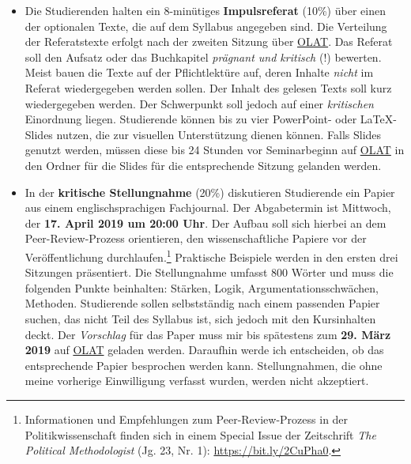 \documentclass[abstract=on,parskip=full,headings=standardclasses,fontsize=11pt,paper=a4]{scrartcl}
\begin{document}
\begin{itemize}
\item Die Studierenden halten ein 8-minütiges \textbf{Impulsreferat} (10\%)  über einen der optionalen Texte, die auf dem Syllabus angegeben sind. Die Verteilung der Referatstexte erfolgt nach der zweiten Sitzung über \href{https://lms.uzh.ch/url/RepositoryEntry/16539681116?guest=true&lang=en}{OLAT}. Das Referat soll den Aufsatz oder das Buchkapitel \textit{prägnant und kritisch} (!) bewerten. Meist bauen die Texte auf der Pflichtlektüre auf, deren Inhalte \textit{nicht} im Referat wiedergegeben werden sollen. Der Inhalt des gelesen Texts soll kurz wiedergegeben werden. Der Schwerpunkt  soll jedoch auf einer \textit{kritischen} Einordnung liegen.  Studierende können bis zu vier PowerPoint- oder LaTeX-Slides nutzen, die zur visuellen Unterstützung dienen können. Falls Slides genutzt werden, müssen diese bis 24 Stunden vor Seminarbeginn auf \href{https://lms.uzh.ch/url/RepositoryEntry/16539681116?guest=true&lang=en}{OLAT} in den Ordner für die Slides für die entsprechende Sitzung gelanden werden. 

\item In der \textbf{kritische Stellungnahme} (20\%) diskutieren Studierende ein Papier aus einem englischsprachigen Fachjournal. Der Abgabetermin ist Mittwoch, der \textbf{17. April 2019 um 20:00 Uhr}.   Der Aufbau soll sich hierbei an dem Peer-Review-Prozess orientieren, den wissenschaftliche Papiere vor der Veröffentlichung durchlaufen.\footnote{Informationen und Empfehlungen zum Peer-Review-Prozess in der Politikwissenschaft finden sich in einem Special Issue der Zeitschrift \textit{The Political Methodologist}  (Jg. 23, Nr. 1): \url{https://bit.ly/2CuPha0}.} Praktische Beispiele werden in den ersten drei Sitzungen präsentiert. Die Stellungnahme umfasst 800 Wörter und  muss die folgenden Punkte beinhalten: Stärken, Logik, Argumentationsschwächen, Methoden. Studierende sollen selbstständig nach einem passenden Papier suchen, das nicht Teil des Syllabus ist, sich jedoch  mit den Kursinhalten deckt. Der \textit{Vorschlag} für das Paper muss mir bis spätestens zum \textbf{29. März 2019}  auf \href{https://lms.uzh.ch/url/RepositoryEntry/16539681116?guest=true&lang=en}{OLAT} geladen werden. Daraufhin werde ich entscheiden, ob das entsprechende Papier besprochen werden kann. Stellungnahmen, die ohne meine vorherige Einwilligung verfasst wurden, werden nicht akzeptiert. 



\end{itemize}
\end{document}
